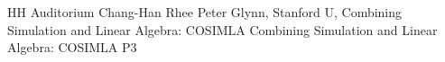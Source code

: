 {HH Auditorium}	%
{Chang-Han Rhee}		%
{Peter Glynn, Stanford U, Combining Simulation and Linear Algebra: COSIMLA}	%
{Combining Simulation and Linear Algebra: COSIMLA}		%
{P3}		%
\\\hline
